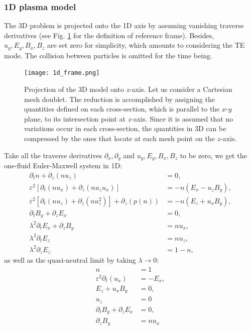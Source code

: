 \documentclass{article}
\begin{document}
\subsubsection{1D plasma model}
The 3D problem is projected onto the 1D axis by assuming vanishing traverse derivatives (see Fig. \ref{fig:1d-frame} for the definition of reference frame). Besides, $u_y, E_y, B_x, B_z$ are set zero for simplicity, which amounts to considering the TE mode. The collision between particles is omitted for the time being. 
\begin{figure}
    \centering
    \texttt{[image: 1d\_frame.png]}
    \caption{Projection of the 3D model onto $z$-axis. Let us consider a Cartesian mesh doublet. The reduction is accomplished by assigning the quantities defined on each cross-section, which is parallel to the $x$-$y$ plane, to its intersection point at $z$-axis. Since it is assumed that no variations occur in each cross-section, the quantities in 3D can be compressed by the ones that locate at each mesh point on the $z$-axis.}
    \label{fig:1d-frame}
\end{figure}

Take all the traverse derivatives $\partial_x, \partial_y$ and $u_y, E_y, B_x, B_z$ to be zero, we get the one-fluid Euler-Maxwell system in 1D:
\begin{align*}
    \partial_t n + \partial_z(nu_z) &= 0, \\
    \varepsilon^2[\partial_t(nu_x) + \partial_z(nu_zu_x)] &= - n(E_x - u_zB_y), \\
    \varepsilon^2[\partial_t(nu_z) + \partial_z(nu_z^2)] + \partial_z(p(n)) &= -n(E_z + u_xB_y), \\
    \partial_t B_y + \partial_z E_x &= 0, \\
    \lambda^2 \partial_t E_x + \partial_z B_y &= nu_x, \\
    \lambda^2 \partial_t E_z &= nu_z, \\
    \lambda^2 \partial_z E_z &= 1 - n,
\end{align*}
as well as the quasi-neutral limit by taking $\lambda \rightarrow 0$:
\begin{align*}
    n &= 1\\
    \varepsilon^2 \partial_t(u_x) &= - E_x, \\
    E_z + u_xB_y &= 0, \\
    u_z &= 0 \\
    \partial_t B_y + \partial_z E_x &= 0, \\
    \partial_z B_y &= nu_x
\end{align*}
\end{document}
